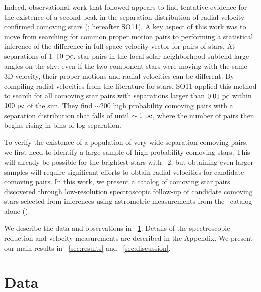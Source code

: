 \documentclass[modern, letterpaper]{aastex61}
\newcommand{\gaia}{\project{Gaia}}
\newcommand{\DR}[1]{\acronym{DR}#1}
\newcommand{\tgas}{\acronym{TGAS}}
\begin{document}
Indeed, observational work that followed appears to find tentative evidence for
the existence of a second peak in the separation distribution of
radial-velocity-confirmed comoving stars (\citealt{Shaya:2011}; hereafter SO11).
A key aspect of this work was to move from searching for common proper motion
pairs to performing a statistical inference of the difference in full-space
velocity vector for pairs of stars.
At separations of $1$--$10~\mathrm{pc}$, star pairs in the local solar neighborhood
subtend large angles on the sky: even if the two component stars were moving
with the same 3D velocity, their proper motions and radial velocities can be
different.
By compiling radial velocities from the literature for 
stars, SO11 applied this method to search for all comoving star pairs with
separations larger than $0.01~\mathrm{pc}$ within $100~\mathrm{pc}$ of the sun.
They find $\sim 200$ high probability comoving pairs with a separation
distribution that falls of until $\sim 1~\mathrm{pc}$, where the number of pairs then
begins rising in bins of log-separation.

To verify the existence of a population of very wide-separation comoving pairs,
we first need to identify a large sample of high-probability comoving stars.
This will already be possible for the brightest stars with \gaia\ \DR{2}, but
obtaining even larger samples will require significant efforts to obtain radial
velocities for candidate comoving pairs.
In this work, we present a catalog of comoving star pairs discovered through
low-resolution spectroscopic follow-up of candidate comoving stars selected from
inferences using astrometric measurements from the \tgas\ catalog alone
(\citealt{Oh:2017}).

We describe the data and observations in \sectionname~\ref{sec:data}.
Details of the spectroscopic reduction and velocity measurements are described
in the Appendix.
We present our main results in \sectionname~\ref{sec:results} and
\sectionname~\ref{sec:discussion}.

\section{Data}\label{sec:data}
\end{document}
